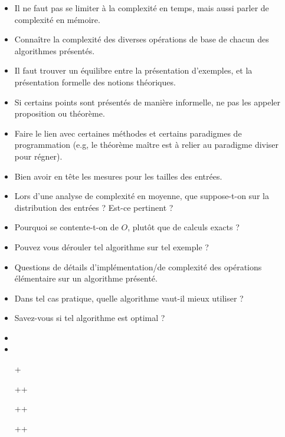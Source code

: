 \documentclass{agregfiche}
\begin{document}
\secpieges

\begin{itemize}
    \item Il ne faut pas se limiter à la complexité en temps, mais aussi parler de complexité en mémoire.
    \item Connaître la complexité des diverses opérations de base de chacun des algorithmes présentés.
    \item Il faut trouver un équilibre entre la présentation d'exemples, et la présentation formelle des notions théoriques.
    \item Si certains points sont présentés de manière informelle, ne pas les appeler proposition ou théorème.
    \item Faire le lien avec certaines méthodes et certains paradigmes
    de programmation (e.g, le théorème maître est à relier au
    paradigme diviser pour régner).
    \item Bien avoir en tête les mesures pour les tailles des entrées.
\end{itemize}

\secquestionsclassiques

\begin{itemize}
	\item Lors d'une analyse de complexité en moyenne, que
	suppose-t-on sur la distribution des entrées ? Est-ce pertinent ?
    \item Pourquoi se contente-t-on de $O$, plutôt que de calculs
    exacts ?
    \item Pouvez vous dérouler tel algorithme sur tel exemple ?
    \item Questions de détails d'implémentation/de complexité des opérations élémentaire sur un algorithme présenté.
    \item Dans tel cas pratique, quelle algorithme vaut-il mieux utiliser ?
    \item Savez-vous si tel algorithme est optimal ?

\end{itemize}

\secreferences

\begin{itemize}
\item 
\item 

\end{itemize}

\secdev

\begin{itemize}
\item[+] 
\item[++] 
\item[++] 
\item[++] 
\end{itemize}
\end{document}
